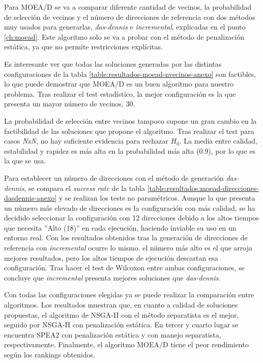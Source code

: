 Para MOEA/D se va a comparar diferente cantidad de vecinos, la probabilidad de selección de vecinos y el número de direcciones de referencia con dos métodos muy usados para generarlas, \textit{das-dennis} e \textit{incremental}, explicadas en el punto \ref{ch:moead}. Este algoritmo solo se va a probar con el método de penalización estática, ya que no permite restricciones explícitas.

Es interesante ver que todas las soluciones generadas por las distintas configuraciones de la tabla \ref{table:resultados-moead-nvecinos-anexo} son factibles, lo que puede demostrar que MOEA/D es un buen algoritmo para nuestro problema. Tras realizar el test estadístico, la mejor configuración es la que presenta un mayor número de vecinos, 30.

La probabilidad de selección entre vecinos tampoco supone un gran cambio en la factibilidad de las soluciones que propone el algoritmo. Tras realizar el test para casos \textit{NxN}, no hay suficiente evidencia para rechazar \(H_0\). La media entre calidad, estabilidad y rapidez es más alta en la probabilidad más alta (0.9), por lo que es la que se usa.

Para establecer un número de direcciones con el método de generación \textit{das-dennis}, se compara el \textit{success rate} de la tabla \ref{table:resultados:moead-direcciones-dasdennis-anexo} y se realizan los tests no paramétricos. Aunque la que presenta un número más elevado de direcciones es la configuración con más calidad, se ha decidido seleccionar la configuración con 12 direcciones debido a los altos tiempos que necesita ''Alto (18)'' en cada ejecución, haciendo inviable su uso en un entorno real. Con los resultados obtenidos tras la generación de direcciones de referencia con \textit{incremental} ocurre lo mismo. el número más alto es el que arroja mejores resultados, pero los altos tiempos de ejecución descartan esa configuración. Tras hacer el test de Wilcoxon entre ambas configuraciones, se concluye que \textit{incremental} presenta mejores soluciones que \textit{das-dennis}.

Con todas las configuraciones elegidas ya se puede realizar la comparación entre algoritmos. Los resultados muestran que, en cuanto a calidad de soluciones propuestas, el algoritmo de NSGA-II con el método separatista es el mejor, seguido por NSGA-II con penalización estática. En tercer y cuarto lugar se encuentra SPEA2 con penalización estática y con manejo separatista, respectivamente. Finalmente, el algoritmo MOEA/D tiene el peor rendimiento según los rankings obtenidos.

